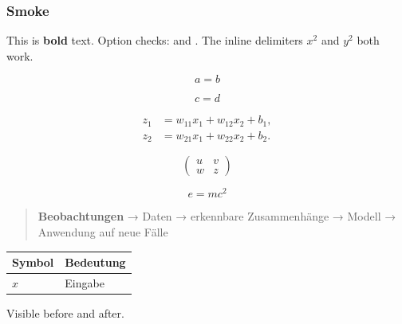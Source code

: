 \begin{frame}[t]
\frametitle{Smoke}

This is \textbf{bold} text.
Option checks: \cite{single} and \parencite{group}.
The inline delimiters $x^2$ and \(y^2\) both work.

\[
a = b
\]

\[
c = d
\]

\[
\begin{aligned}
z_1 &= w_{11}x_1+w_{12}x_2+b_1, \\
z_2 &= w_{21}x_1+w_{22}x_2+b_2.
\end{aligned}
\]

\[\begin{pmatrix}
u & v \\
w & z
\end{pmatrix}\]


\begin{equation}
e = mc^2
\end{equation}

\begin{quote}
\textbf{Beobachtungen} → Daten → erkennbare Zusammenhänge → Modell → Anwendung auf neue Fälle
\end{quote}

\par\addvspace{\medskipamount}
\noindent\begin{tabularx}{\linewidth}{@{}>{\raggedright\arraybackslash}X>{\raggedright\arraybackslash}X@{}}
\toprule
Symbol & Bedeutung \\
\midrule
$x$ & Eingabe \\
\bottomrule
\end{tabularx}
\par\addvspace{\medskipamount}

%
%
%
Visible before %
and after.

\end{frame}

